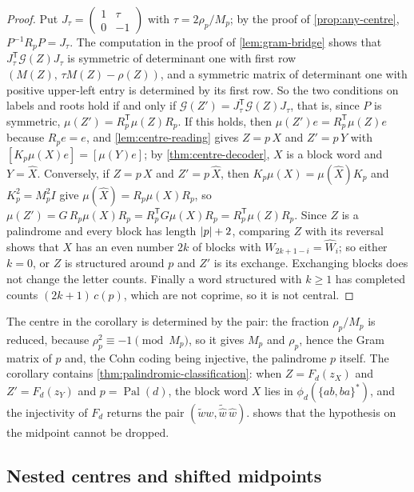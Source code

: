 \begin{proof}
Put $J_\tau=\left(\begin{smallmatrix}1&\tau\\0&-1\end{smallmatrix}\right)$ with $\tau=2\rho_p/M_p$;
by the proof of \cref{prop:any-centre}, $P^{-1}R_pP=J_\tau$. The computation in the proof of
\cref{lem:gram-bridge} shows that $J_\tau^{\mathsf T}\mathcal G(Z)J_\tau$ is symmetric of
determinant one with first row $(M(Z),\,\tau M(Z)-\rho(Z))$, and a symmetric matrix of determinant
one with positive upper-left entry is determined by its first row. So the two conditions on labels
and roots hold if and only if $\mathcal G(Z')=J_\tau^{\mathsf T}\mathcal G(Z)J_\tau$, that is, since $P$
is symmetric, $\mu(Z')=R_p^{\mathsf T}\mu(Z)R_p$. If this holds, then
$\mu(Z')e=R_p^{\mathsf T}\mu(Z)e$ because $R_pe=e$, and \cref{lem:centre-reading} gives $Z=p\,X$ and
$Z'=p\,Y$ with $[K_p\mu(X)e]=[\mu(Y)e]$; by \cref{thm:centre-decoder}, $X$ is a block word and
$Y=\widehat X$. Conversely, if $Z=p\,X$ and $Z'=p\,\widehat X$, then $K_p\mu(X)=\mu(\widehat X)K_p$ and
$K_p^2=M_p^2I$ give $\mu(\widehat X)=R_p\mu(X)R_p$, so
$\mu(Z')=G\,R_p\mu(X)R_p=R_p^{\mathsf T}G\mu(X)R_p=R_p^{\mathsf T}\mu(Z)R_p$. Since $Z$ is a palindrome
and every block has length $\lvert p\rvert+2$, comparing $Z$ with its reversal shows that $X$ has an even
number $2k$ of blocks with $W_{2k+1-i}=\widehat W_i$; so either $k=0$, or $Z$ is structured around
$p$ and $Z'$ is its exchange. Exchanging blocks does not change the letter counts. Finally a word
structured with $k\geqslant1$ has completed counts $(2k+1)\,c(p)$, which are not coprime, so it is
not central.
\end{proof}

The centre in the corollary is determined by the pair: the fraction $\rho_p/M_p$ is reduced,
because $\rho_p^2\equiv-1\pmod{M_p}$, so it gives $M_p$ and $\rho_p$, hence the Gram matrix of $p$
and, the Cohn coding being injective, the palindrome $p$ itself. The corollary contains
\cref{thm:palindromic-classification}: when $Z=F_d(z_X)$ and $Z'=F_d(z_Y)$ and $p=\operatorname{Pal}(d)$,
the block word $X$ lies in $\phi_d(\{ab,ba\}^*)$, and the injectivity of $F_d$ returns the pair
$(\widetilde ww,\widetilde{\widehat w}\,\widehat w)$.  shows that the hypothesis on
the midpoint cannot be dropped.

\subsection{Nested centres and shifted midpoints}
\label{subsec:nested}

